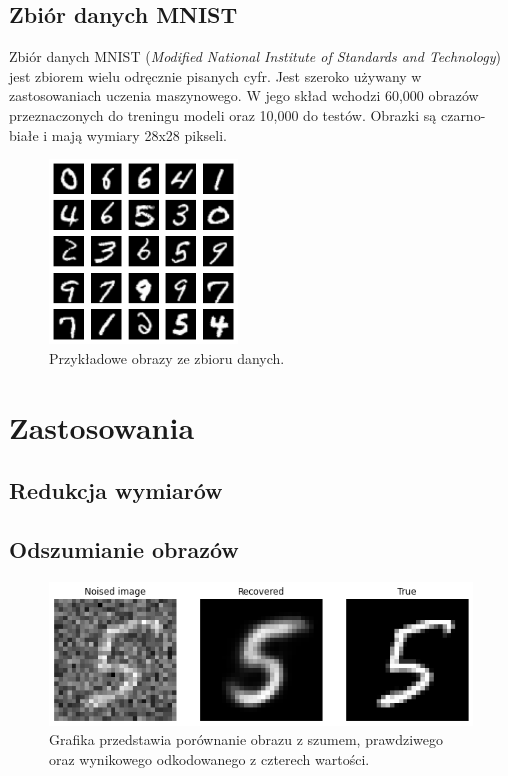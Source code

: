 \documentclass[a4paper,12pt]{book} %
\begin{document}
\subsection{Zbiór danych MNIST}
Zbiór danych MNIST (\textit{Modified National Institute of Standards and Technology})\cite{mnist} jest zbiorem wielu odręcznie pisanych cyfr. Jest szeroko używany w zastosowaniach uczenia maszynowego. W jego skład wchodzi 60,000 obrazów przeznaczonych do treningu modeli oraz 10,000 do testów. Obrazki są czarno-białe i mają wymiary 28x28 pikseli.
\begin{figure}[h]
	\centering\includegraphics[width=5cm]{pictures/mnist.png}
	\caption{Przykładowe obrazy ze zbioru danych.}
\end{figure}
\section{Zastosowania}
\subsection{Redukcja wymiarów}
\lipsum[1]
\subsection{Odszumianie obrazów}
\lipsum[2]
\begin{figure}[h]
	\centering\includegraphics[width=14.5cm]{pictures/noised1.png}
	\caption{Grafika przedstawia porównanie obrazu z szumem, prawdziwego oraz wynikowego odkodowanego z czterech wartości.}
\end{figure}
\end{document}
